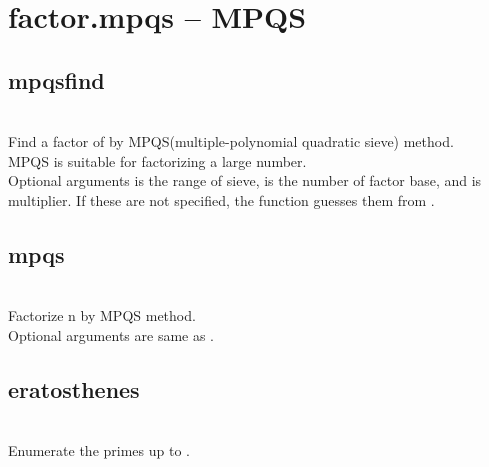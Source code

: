 

 \section{factor.mpqs -- MPQS}
  \subsection{mpqsfind}
   \\
   \spacing
   \quad Find a factor of  by MPQS(multiple-polynomial
   quadratic sieve) method. \\
   \spacing
   \quad  MPQS is suitable for factorizing a large number.\\
   \spacing
   \quad Optional arguments  is the range of sieve,
    is the number of factor base, and  is multiplier.
   If these are not specified, the function guesses them from .\\
%
  \subsection{mpqs}
   \\
   \spacing
   \quad Factorize n by MPQS method.\\
   \spacing
   \quad Optional arguments are same as .
%
  \subsection{eratosthenes}
   \\
   \spacing
   \quad Enumerate the primes up to .\\
\C



